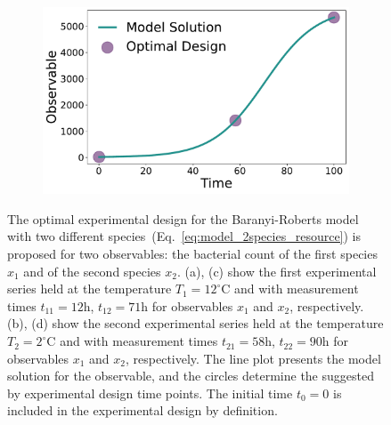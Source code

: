 \documentclass[graybox]{svmult}
\begin{document}
\begin{figure}[H]
\begin{subfigure}{.5\textwidth}
    \end{subfigure}
    \begin{subfigure}{.5\textwidth}
        \centering
        \includegraphics[scale=0.25]{Figures/Fig9d.pdf}
    \end{subfigure} 
    \caption{The optimal experimental design for the Baranyi-Roberts model with two different species~(Eq.~\ref{eq:model_2species_resource}) is proposed for two observables: the bacterial count of the first species $x_1$ and of the second species $x_2$.
    (a), (c) show the first experimental series held at the temperature $T_1=12^\circ$C and with measurement times $t_{11}=12$h, $t_{12}=71$h for observables $x_1$ and $x_2$, respectively.
    (b), (d) show the second experimental series held at the temperature $T_2=2^\circ$C and with measurement times $t_{21}=58$h, $t_{22}=90$h for observables $x_1$ and $x_2$, respectively.
    The line plot presents the model solution for the observable, and the circles determine the suggested by experimental design time points.
    The initial time $t_0=0$ is included in the experimental design by definition.}
    \label{Fig9}
\end{figure}
%
%
%
\end{document}
